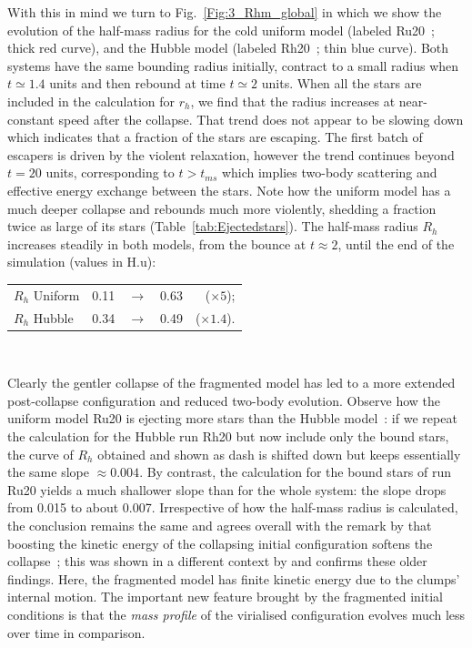 With this in mind  we turn to Fig.~\ref{Fig:3_Rhm_global} in which we show the evolution of the half-mass radius for the cold uniform model (labeled Ru20~; thick red curve), and the Hubble model (labeled Rh20~; thin blue curve). Both systems have the same bounding radius initially, contract to a small radius when $t \simeq 1.4 $ units and then rebound at time $t \simeq 2 $ units. When all the stars are included in the calculation for $r_h$, we find that the radius increases at near-constant speed after the collapse. That trend does not appear to be slowing down which indicates that a fraction of the stars are escaping. The first batch of escapers is driven by the violent relaxation, however the trend continues beyond $ t = 20$ units, corresponding to $t > t_{ms}$ which implies two-body scattering and effective energy exchange between the stars. Note how the uniform model has a much deeper collapse and rebounds much more violently, shedding a fraction twice as large of its stars (Table~\ref{tab:Ejectedstars}). The half-mass radius $R_h$ increases steadily in both models, from the bounce at $t \approx 2$, until the end of the simulation (values in H.u):  
\begin{center}
\begin{tabular}{lllrr}
$R_h$ Uniform & 0.11 &  $\rightarrow$ & 0.63 & ($\times 5$); \\
$R_h$ Hubble & 0.34  &  $\rightarrow$ & 0.49 & ($\times 1.4$). \\
\end{tabular}\\
\end{center}

%
Clearly the gentler collapse of the fragmented model has led to a more extended post-collapse configuration and reduced two-body evolution. Observe how the uniform model Ru20 is ejecting more stars than the Hubble model~: if we repeat the calculation for the Hubble run Rh20 but now include only the bound stars, the curve of $R_h$ obtained and shown as dash is shifted down but keeps essentially the same slope $\approx  0.004$. By contrast, the calculation for the bound stars of run Ru20 yields a much shallower slope than for the whole system: the slope drops from 0.015 to about 0.007. Irrespective of how the half-mass radius is calculated, the conclusion remains the same and agrees overall with the remark by \cite{Caputo2014} that boosting the kinetic energy of the collapsing initial configuration softens the collapse~; this was shown in a different context by \cite{Theis1999} and confirms these older findings.  Here, the fragmented model has finite kinetic energy due to the clumps' internal motion. The important new feature brought by the fragmented initial conditions is that the {\it mass profile} of the virialised configuration evolves much less over time in comparison. 

